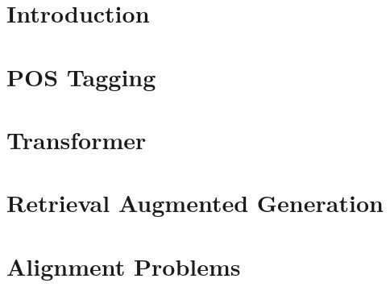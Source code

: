 \chapter{Introduction}



\chapter{POS Tagging}

\chapter{Transformer}

\chapter{Retrieval Augmented Generation}

\chapter{Alignment Problems}

